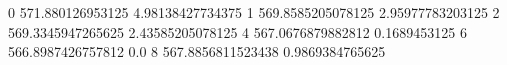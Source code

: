 0 571.880126953125 4.98138427734375
1 569.8585205078125 2.95977783203125
2 569.3345947265625 2.43585205078125
4 567.0676879882812 0.1689453125
6 566.8987426757812 0.0
8 567.8856811523438 0.9869384765625
